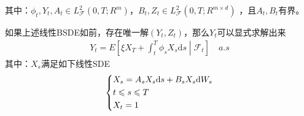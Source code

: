 		其中：${\phi _t},{Y_t},{A_t} \in L_{\mathcal {F}}^2( {0,T;{R^m}})$，${B_t},{Z_t} \in L_{\mathcal {F}}^2( {0,T;{R^{m \times d}}} )$ ，且$A_t,B_t$有界。
		\par
		如果上述线性BSDE如前，存在唯一解$(Y_t,Z_t)$，那么$Y_t$可以显式求解出来
		\begin{align*}
			Y_t = E\left[ \xi X_T +\int_t^T \phi _s X_s\mathrm{d}s\middle| \mathcal{F}_t \right] \quad a.s
		\end{align*}
		其中：$X_s$满足如下线性SDE
			\begin{equation*}
			\centering
			\left\{\begin{lgathered}
			{{X_s} = {A_s}{X_s}{\mathrm{d}s} + {B_s}{X_s}\mathrm{d}{W_s}}\\
			{t \leqslant s \leqslant T}\\
			{{X_t} = 1}
			\end{lgathered} \right.
			\end{equation*}

